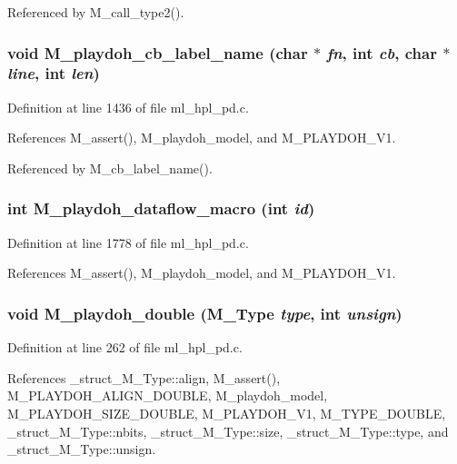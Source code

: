 Referenced by M\_\-call\_\-type2().
\subsubsection{\setlength{\rightskip}{0pt plus 5cm}void M\_\-playdoh\_\-cb\_\-label\_\-name (char $\ast$ {\em fn}, int {\em cb}, char $\ast$ {\em line}, int {\em len})}\label{ml__hpl__pd_8c_1ee71aed79c4b895c80695629e3fe073}




Definition at line 1436 of file ml\_\-hpl\_\-pd.c.

References M\_\-assert(), M\_\-playdoh\_\-model, and M\_\-PLAYDOH\_\-V1.

Referenced by M\_\-cb\_\-label\_\-name().
\subsubsection{\setlength{\rightskip}{0pt plus 5cm}int M\_\-playdoh\_\-dataflow\_\-macro (int {\em id})}\label{ml__hpl__pd_8c_5e4d9ef05638e59297bec9a426bdff76}




Definition at line 1778 of file ml\_\-hpl\_\-pd.c.

References M\_\-assert(), M\_\-playdoh\_\-model, and M\_\-PLAYDOH\_\-V1.
\subsubsection{\setlength{\rightskip}{0pt plus 5cm}void M\_\-playdoh\_\-double (\bf{M\_\-Type} {\em type}, int {\em unsign})}\label{ml__hpl__pd_8c_a726eedb0635ce651933c8b58be9eafe}




Definition at line 262 of file ml\_\-hpl\_\-pd.c.

References \_\-struct\_\-M\_\-Type::align, M\_\-assert(), M\_\-PLAYDOH\_\-ALIGN\_\-DOUBLE, M\_\-playdoh\_\-model, M\_\-PLAYDOH\_\-SIZE\_\-DOUBLE, M\_\-PLAYDOH\_\-V1, M\_\-TYPE\_\-DOUBLE, \_\-struct\_\-M\_\-Type::nbits, \_\-struct\_\-M\_\-Type::size, \_\-struct\_\-M\_\-Type::type, and \_\-struct\_\-M\_\-Type::unsign.

